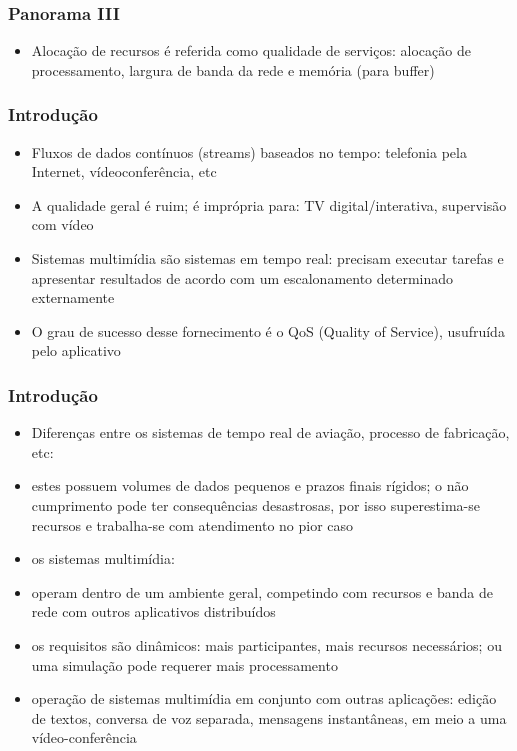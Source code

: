 \documentclass[]{beamer}
\begin{document}
\begin{frame}
  \frametitle{Panorama III}
\begin{itemize}
  \item Alocação de recursos é referida como qualidade de serviços: alocação de processamento,
largura de banda da rede e memória (para buffer)
\end{itemize}
\end{frame}


\begin{frame}
  \frametitle{Introdução}
\begin{itemize}
  \item Fluxos de dados contínuos (streams) baseados no tempo: telefonia pela Internet, 
vídeoconferência, etc
  \item A qualidade geral é ruim; é imprópria para: TV digital/interativa, supervisão com vídeo
  \item Sistemas multimídia são sistemas em tempo real: precisam executar tarefas e apresentar
resultados de acordo com um escalonamento determinado externamente
  \item O grau de sucesso desse fornecimento é o QoS (Quality of Service), usufruída
pelo aplicativo
\end{itemize}
\end{frame}

\begin{frame}
  \frametitle{Introdução}
\begin{itemize}
  \item Diferenças entre os sistemas de tempo real de aviação, processo de fabricação, etc: 
  \item estes possuem volumes de dados pequenos e prazos finais rígidos; o não cumprimento pode ter
consequências desastrosas, por isso superestima-se recursos e trabalha-se com atendimento 
no pior caso
  \item os sistemas multimídia:
  \item operam dentro de um ambiente geral, competindo com recursos e banda de rede com
 outros aplicativos distribuídos
  \item os requisitos são dinâmicos: mais participantes, mais recursos necessários; ou uma 
simulação pode requerer mais processamento
  \item operação de sistemas multimídia em conjunto com outras aplicações: edição de textos, 
conversa de voz separada, mensagens instantâneas, em meio a uma vídeo-conferência
\end{itemize}
\end{frame}
\end{document}
